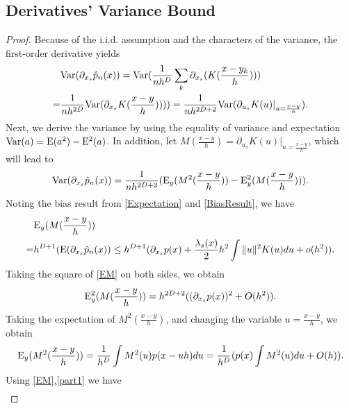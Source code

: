 \documentclass[aos,preprint]{imsart}
\theoremstyle{remark}
\begin{document}
\begin{appendix}
\subsection{Derivatives' Variance Bound}\label{variance_proof}
\begin{proof}
Because of the i.i.d. assumption and the characters of the variance, the first-order derivative yields
\[
\begin{aligned}
 &{\rm Var} (\partial_{x_s} \hat{p}_n(x))  = {\rm Var} (\frac{1}{n h^D}\sum_k \partial_{x_s}(K(\frac{x-y_k}{h})))\\
  = &\frac{1}{n h^{2D}} {\rm Var}(  \partial_{x_s} K(\frac{x-y}{h}))))=  \frac{1}{n h^{2D+2}} {\rm Var} (\partial_ {u_s}  K(u)|_{u=\frac{x-y}{h}}).%
\end{aligned}
\]
Next, we derive the variance by using the equality of variance and expectation ${\rm Var}(a) = {\rm E}(a^2)-{\rm E}^2(a)$.
In addition, let $M(\frac{x-y}{h}) = \partial_ {u_s}  K(u)|_{u=\frac{x-y}{h}}$, which will lead to
\begin{equation}\label{e11}
 {\rm Var} (\partial_{x_s} \hat{p}_n(x)) = \frac{1}{nh^{2D+2}}({\rm E}_y (M^2(\frac{x-y}{h}))-{\rm E}^2_y(M(\frac{x-y}{h}))).
\end{equation}
Noting the bias result from \eqref{Expectation} and \eqref{BiasResult}, we have
\begin{equation}\label{EM}
\begin{aligned}
&{\rm E}_y(M(\frac{x-y}{h})) \\
= &h^{D+1} ( {\rm E}(\partial_{x_s} \hat{p}_n(x))\leq h^{D+1} (\partial_{x_s} p(x)+\frac{\lambda_s(x)}{2} h^2 \int \|u\|^2 K(u) du+o(h^2)).
\end{aligned}
\end{equation}
Taking the square of \eqref{EM} on both sides, we obtain
\[
{\rm E}^2_y(M(\frac{x-y}{h})) = h^{2D+2}((\partial_{x_s} p(x))^2+ O(h^2)).
\]
Taking the expectation of $M^2(\frac{x-y}{h})$, and changing the variable $u=\frac{x-y}{h}$, we obtain
\begin{equation}\label{part1}
{\rm E}_y(M^2(\frac{x-y}{h})) = \frac{1}{h^D} \int M^2(u) p(x-uh) du = \frac{1}{h^D}(p(x)\int M^2(u)du+O(h)).
\end{equation}
Using \eqref{EM},\eqref{part1} we have
\begin{equation}\label{Var}
\begin{aligned}

\end{aligned}
\end{equation}
\end{proof}
\end{appendix}
\end{document}
